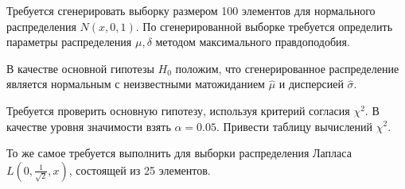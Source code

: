 \item Требуется сгенерировать выборку размером 100 элементов для нормального распределения $N(x, 0, 1)$. По сгенерированной выборке требуется определить параметры распределения $\mu, \delta$ методом максимального правдоподобия.

В качестве основной гипотезы $H_0$ положим, что сгенерированное распределение является нормальным с неизвестными матожиданием $\hat{\mu}$ и дисперсией $\hat{\sigma}$.

Требуется проверить основную гипотезу, используя критерий согласия $\chi^2$. В качестве уровня значимости взять $\alpha=0.05$. Привести таблицу вычислений $\chi^2$.

То же самое требуется выполнить для выборки распределения Лапласа $L(0, \frac{1}{\sqrt{2}}, x)$, состоящей из 25 элементов.